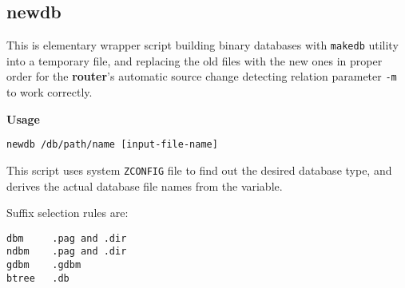\subsection{newdb}



This is elementary wrapper script building binary databases
with {\tt makedb} utility into a temporary file, and replacing
the old files with the new ones in proper order for the 
{\bf router}'s automatic source change detecting relation 
parameter {\tt -m} to work correctly.

{\bf Usage}

\begin{verbatim}
newdb /db/path/name [input-file-name]
\end{verbatim}


This script uses system {\tt ZCONFIG} file to find out the desired
database type, and derives the actual database file names from the 
variable.

Suffix selection rules are:

\begin{verbatim}
dbm     .pag and .dir
ndbm    .pag and .dir
gdbm    .gdbm
btree   .db   
\end{verbatim}
